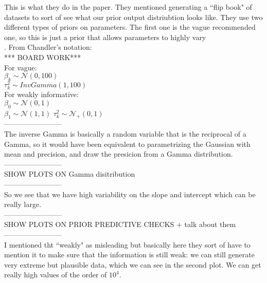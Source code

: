 \documentclass[]{article}
\begin{document}
This is what they do in the paper. They mentioned generating a ``flip book" of datasets to sort of see what our prior output distriubtion looks like. They use two different types of priors on parameters. The first one is the vague recommended one, so this is just a prior that allows parameters to highly vary\\. From Chandler's notation:\\
*** BOARD WORK***\\
For vague: \\
$\beta_k \sim \mathcal{N}(0,100)$\\
$\tau_k^2 \sim InvGamma(1,100)$\\
For weakly informative:\\
$\beta_0 \sim \mathcal{N}(0,1)$\\
$\beta_1 \sim \mathcal{N}(1,1)$
$\tau_k^2 \sim \mathcal{N}_{+}(0,1)$\\
------------------------\\
The inverse Gamma is basically a random variable that is the reciprocal of a Gamma, so it would have been equivalent to parametrizing the Gaussian with mean and precision, and draw the presicion from a Gamma distribution. \\
------------------------\\SHOW PLOTS ON Gamma disitribution\\  ------------------------\\
So we see that we have high variability on the slope and intercept which can be really large. \\
------------------------\\SHOW PLOTS ON PRIOR PREDICTIVE CHECKS + talk about them\\ ------------------------\\
I mentioned tht ``weakly" as misleading but basically here they sort of have to mention it to make sure that the information is still weak: we can still generate very extreme but plausible data, which we can see in the second plot. We can get really high values of the order of $10^4$. \\
\end{document}
